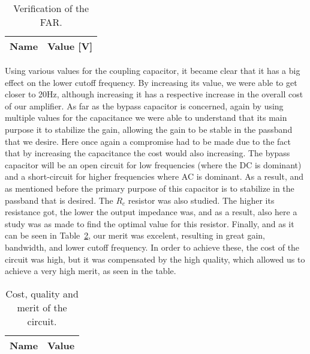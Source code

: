 \begin{table}[H]
 \centering
 \begin{tabular}{|l|r|}
 \hline
 {\bf Name} & {\bf Value [V]} \\ \hline

 \end{tabular}
 \caption{Verification of the FAR.}
 \label{tab:forwardbias}
 \end{table}

Using various values for the coupling capacitor, it became clear that it has a big
effect on the lower cutoff frequency. By increasing its value, we were able to get
closer to 20Hz, although increasing it has a respective increase in the overall
cost of our amplifier.
As far as the bypass capacitor is concerned, again by using multiple values for
the capacitance we were able to understand that its main purpose it to stabilize
the gain, allowing the gain to be stable in the passband that we desire. Here once
again a compromise had to be made due to the fact that by increasing the
capacitance the cost would also increasing.
The bypass capacitor will be an open circuit for low frequencies (where the DC is
dominant) and a short-circuit for higher frequencies where AC is dominant. As a
result, and as mentioned before the primary purpose of this capacitor is to
stabilize in the passband that is desired.
The $R_c$ resistor was also studied. The higher its resistance got, the lower the
output impedance was, and as a result, also here a study was as made to find the
optimal value for this resistor.
Finally, and as it can be seen in Table~\ref{tab:merit_spice}, our merit was excelent, resulting in great gain, bandwidth, and lower cutoff frequency. In order to achieve these, the cost of the circuit was high, but it was compensated by the high quality, which allowed us to achieve a very high merit, as seen in the table. 

\begin{table}[H]
 \centering
 \begin{tabular}{|l|r|}
 \hline
 {\bf Name} & {\bf Value} \\ \hline

 \end{tabular}
 \caption{Cost, quality and merit of the circuit.}
 \label{tab:merit_spice}
\end{table}
